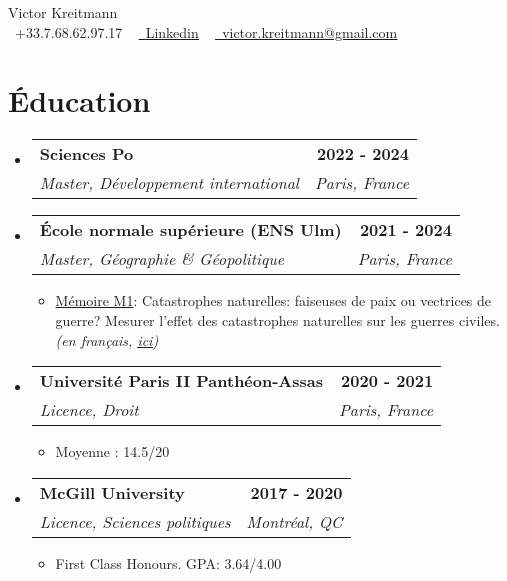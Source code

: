 \documentclass[a4paper,11pt]{article}
\makeatletter
\newcommand{\resumeItem}[1]{
  \item\small{
    {#1 \vspace{-2pt}}
  }
}
\newcommand{\resumeSubheading}[4]{
  \vspace{-2pt}\item
    \begin{tabular*}{1.00\textwidth}[t]{l@{\extracolsep{\fill}}r}
      \textbf{{\small #1}} & {\textbf{\small #2}} \\
      \textit{\small#3} & \textit{\small #4} \\
    \end{tabular*}\vspace{-7pt}
}
\newcommand{\resumeSubHeadingListStart}{\begin{itemize}[leftmargin=0.0in, label={}]}
\newcommand{\resumeSubHeadingListEnd}{\end{itemize}}
\newcommand{\resumeItemListStart}{\begin{itemize}}
\newcommand{\resumeItemListEnd}{\end{itemize}\vspace{-5pt}}
\makeatother
\begin{document}

\begin{center}
    {\Huge \upshape Victor Kreitmann} \\ \vspace{1pt}
    \small \raisebox{-0.1\height}\faPhone\ +33.7.68.62.97.17 ~
    \href{https://www.linkedin.com/in/victor-kreitmann/}{\raisebox{-0.2\height}\faLinkedin\ \underline{Linkedin}}  ~    
    \href{mailto:victor.kreitmann@gmail.com}{\raisebox{-0.2\height}\faEnvelope\  \underline{victor.kreitmann@gmail.com}} ~ 
    \vspace{0pt}
\end{center}




\section{Éducation}
  \resumeSubHeadingListStart
    \resumeSubheading
      {Sciences Po}{2022 - 2024}
      {Master, Développement international}{Paris, France}
      
      \resumeSubheading
      {École normale supérieure (ENS Ulm)}{2021 - 2024}
      {Master, Géographie \& Géopolitique}{Paris, France}
      \resumeItemListStart
      \resumeItem{\underline{Mémoire M1}: Catastrophes naturelles: faiseuses de paix ou vectrices de guerre? Mesurer l'effet des catastrophes naturelles sur les guerres civiles.\emph{(en français, \href{https://drive.google.com/file/d/1O6ke_2wZjExpSnBBnSKN7shPb0E3ZBgg/view?usp=sharing}{\underline{ici}})}}
      \resumeItemListEnd
      
      \resumeSubheading
      {Université Paris II Panthéon-Assas}{2020 - 2021}
      {Licence, Droit}{Paris, France}
      \resumeItemListStart
      \resumeItem{Moyenne : 14.5/20}
      \resumeItemListEnd
      
      \resumeSubheading
      {McGill University}{2017 - 2020}
      {Licence, Sciences politiques}{Montréal, QC}
      \resumeItemListStart
      \resumeItem{First Class Honours. GPA: 3.64/4.00}
      \resumeItemListEnd
  \resumeSubHeadingListEnd
\vspace{-10pt}
\end{document}
